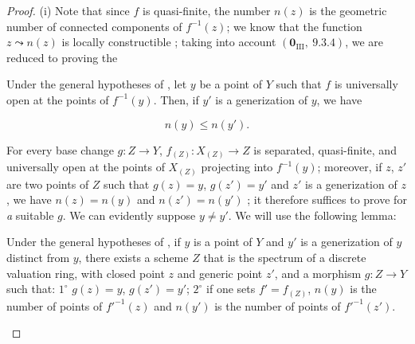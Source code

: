 \begin{proof}
(i)
Note that since $f$ is quasi-finite, the number $n(z)$ is the geometric number of connected components of $f^{-1}(z)$; we know that the function $z\leadsto n(z)$ is locally constructible ; taking into account $(\mathbf{0}_{\mathrm{III}},~9.3.4)$, we are reduced to proving the

\begin{corollary}[15.5.2]
\label{IV.15.5.2}
Under the general hypotheses of , let $y$ be a point of $Y$ such that $f$ is universally open at the points of $f^{-1}(y)$.
Then, if $y'$ is a generization of $y$, we have
\end{corollary}

\begin{equation}
\tag{15.5.2.1}
\label{IV.15.5.2.1}
  n(y) \leq n(y').
\end{equation}

For every base change $g:Z\to Y$, $f_{(Z)}:X_{(Z)}\to Z$ is separated, quasi-finite, and universally open at the points of $X_{(Z)}$ projecting into $f^{-1}(y)$; moreover, if $z$, $z'$ are two points of $Z$ such that $g(z)=y$, $g(z')=y'$ and $z'$ is a generization of $z$, we have $n(z)=n(y)$ and $n(z')=n(y')$ ; it therefore suffices to prove  for \emph{a} suitable $g$.
We can evidently suppose $y\neq y'$.
We will use the following lemma:

\begin{lemma}[15.5.2.2]
\label{IV.15.5.2.2}
Under the general hypotheses of , if $y$ is a point of $Y$ and $y'$ is a generization of $y$ distinct from $y$, there exists a scheme $Z$ that is the spectrum of a discrete valuation ring, with closed point $z$ and generic point $z'$, and a morphism $g:Z\to Y$ such that:
$1^\circ$ $g(z)=y$, $g(z')=y'$;
$2^\circ$ if one sets $f'=f_{(Z)}$, $n(y)$ is the number of points of $f'^{-1}(z)$ and $n(y')$ is the number of points of $f'^{-1}(z')$.
\end{lemma}


\end{proof}
